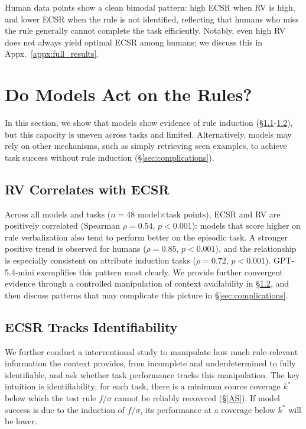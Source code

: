 \documentclass[11pt]{article}
\begin{document}
Human data points show a clean bimodal pattern: high ECSR when RV is high, and lower ECSR when the rule is not identified, reflecting that humans who miss the rule generally cannot complete the task efficiently. Notably, even high RV does not always yield optimal ECSR among humans; we discuss this in Appx.~\ref{appx:full_results}. 




\section{Do Models Act on the Rules?}
\label{sec:rule_induction}

In this section, we show that models show evidence of rule induction (\S\ref{sec:rv_ecsr_correlation}-\ref{sec:coverage_sweep}), but this capacity is uneven across tasks and limited. Alternatively, models may rely on other mechanisms, such as simply retrieving seen examples, to achieve task success without rule induction (\S\ref{sec:complications}).

\subsection{RV Correlates with ECSR}
\label{sec:rv_ecsr_correlation}

Across all models and tasks ($n=48$ model$\times$task points), ECSR and
RV are positively correlated (Spearman $\rho=0.54$, $p<0.001$): models
that score higher on rule verbalization also tend to perform better on
the episodic task.
A stronger positive trend is observed for humans ($\rho=0.85$, $p<0.001$), and the relationship is especially consistent on attribute induction tasks ($\rho=0.72$, $p<0.001$).
GPT-5.4-mini exemplifies this pattern most clearly. We provide further convergent evidence through a controlled manipulation of context availability in \S\ref{sec:coverage_sweep}, and then discuss patterns that may complicate this picture in \S\ref{sec:complications}.

\subsection{ECSR Tracks Identifiability}
\label{sec:coverage_sweep}

We further conduct a interventional study to manipulate how much rule-relevant information the context provides, from incomplete and underdetermined to fully identifiable, and ask whether task performance tracks this manipulation.
The key intuition is identifiability: for each task, there is a minimum source coverage $k^*$ below which the test rule $f/\sigma$ cannot be reliably recovered (\S\ref{AS}). 
If model success is due to the induction of $f/\sigma$, its performance at a coverage below $k^*$ will be lower.
\end{document}
